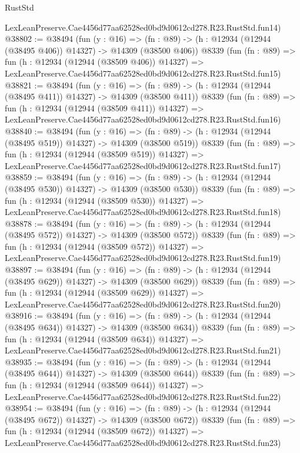 \begin{lexlean}{RustStd}
\begin{coremodule}
    LexLeanPreserve.Cae4456d77aa62528ed0bd9d0612cd278.R23.RustStd.fun14)
@38802 := @38494
    (fun (y : @16) =>
    (fn : @89) -> (h : @12934 (@12944 (@38495 @406)) @14327) -> @14309 (@38500 @406))
    @8339
    (fun (fn : @89) =>
    fun (h : @12934 (@12944 (@38509 @406)) @14327) =>
    LexLeanPreserve.Cae4456d77aa62528ed0bd9d0612cd278.R23.RustStd.fun15)
@38821 := @38494
    (fun (y : @16) =>
    (fn : @89) -> (h : @12934 (@12944 (@38495 @411)) @14327) -> @14309 (@38500 @411))
    @8339
    (fun (fn : @89) =>
    fun (h : @12934 (@12944 (@38509 @411)) @14327) =>
    LexLeanPreserve.Cae4456d77aa62528ed0bd9d0612cd278.R23.RustStd.fun16)
@38840 := @38494
    (fun (y : @16) =>
    (fn : @89) -> (h : @12934 (@12944 (@38495 @519)) @14327) -> @14309 (@38500 @519))
    @8339
    (fun (fn : @89) =>
    fun (h : @12934 (@12944 (@38509 @519)) @14327) =>
    LexLeanPreserve.Cae4456d77aa62528ed0bd9d0612cd278.R23.RustStd.fun17)
@38859 := @38494
    (fun (y : @16) =>
    (fn : @89) -> (h : @12934 (@12944 (@38495 @530)) @14327) -> @14309 (@38500 @530))
    @8339
    (fun (fn : @89) =>
    fun (h : @12934 (@12944 (@38509 @530)) @14327) =>
    LexLeanPreserve.Cae4456d77aa62528ed0bd9d0612cd278.R23.RustStd.fun18)
@38878 := @38494
    (fun (y : @16) =>
    (fn : @89) -> (h : @12934 (@12944 (@38495 @572)) @14327) -> @14309 (@38500 @572))
    @8339
    (fun (fn : @89) =>
    fun (h : @12934 (@12944 (@38509 @572)) @14327) =>
    LexLeanPreserve.Cae4456d77aa62528ed0bd9d0612cd278.R23.RustStd.fun19)
@38897 := @38494
    (fun (y : @16) =>
    (fn : @89) -> (h : @12934 (@12944 (@38495 @629)) @14327) -> @14309 (@38500 @629))
    @8339
    (fun (fn : @89) =>
    fun (h : @12934 (@12944 (@38509 @629)) @14327) =>
    LexLeanPreserve.Cae4456d77aa62528ed0bd9d0612cd278.R23.RustStd.fun20)
@38916 := @38494
    (fun (y : @16) =>
    (fn : @89) -> (h : @12934 (@12944 (@38495 @634)) @14327) -> @14309 (@38500 @634))
    @8339
    (fun (fn : @89) =>
    fun (h : @12934 (@12944 (@38509 @634)) @14327) =>
    LexLeanPreserve.Cae4456d77aa62528ed0bd9d0612cd278.R23.RustStd.fun21)
@38935 := @38494
    (fun (y : @16) =>
    (fn : @89) -> (h : @12934 (@12944 (@38495 @644)) @14327) -> @14309 (@38500 @644))
    @8339
    (fun (fn : @89) =>
    fun (h : @12934 (@12944 (@38509 @644)) @14327) =>
    LexLeanPreserve.Cae4456d77aa62528ed0bd9d0612cd278.R23.RustStd.fun22)
@38954 := @38494
    (fun (y : @16) =>
    (fn : @89) -> (h : @12934 (@12944 (@38495 @672)) @14327) -> @14309 (@38500 @672))
    @8339
    (fun (fn : @89) =>
    fun (h : @12934 (@12944 (@38509 @672)) @14327) =>
    LexLeanPreserve.Cae4456d77aa62528ed0bd9d0612cd278.R23.RustStd.fun23)

\end{coremodule}
\end{lexlean}
